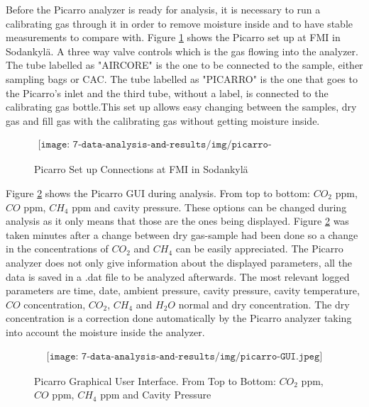 Before the Picarro analyzer is ready for analysis, it is necessary to run a calibrating gas through it in order to remove moisture inside and to have stable measurements to compare with. Figure \ref{fig:picarro-connections} shows the Picarro set up at FMI in Sodankyl\"{a}. A three way valve controls which is the gas flowing into the analyzer. The tube labelled as "AIRCORE" is the one to be connected to the sample, either sampling bags or CAC. The tube labelled as "PICARRO" is the one that goes to the Picarro's inlet and the third tube, without a label, is connected to the calibrating gas bottle.This set up allows easy changing between the samples, dry gas and fill gas with the calibrating gas without getting moisture inside.

\begin{figure}[H]
    \begin{align*}
        \texttt{[image: 7-data-analysis-and-results/img/picarro-connections.jpeg]}
    \end{align*}
    \caption{Picarro Set up Connections at FMI in Sodankyl\"{a} \label{fig:picarro-connections}}
\end{figure}

Figure \ref{fig:picarro-GUI} shows the Picarro GUI during analysis. From top to bottom: $CO_2$ ppm, $CO$ ppm, $CH_4$ ppm and cavity pressure. These options can be changed during analysis as it only means that those are the ones being displayed. Figure \ref{fig:picarro-GUI} was taken minutes after a change between dry gas-sample had been done so a change in the concentrations of $CO_2$ and $CH_4$ can be easily appreciated. 
The Picarro analyzer does not only give information about the displayed parameters, all the data is saved in a .dat file to be analyzed afterwards. The most relevant logged parameters are time, date, ambient pressure, cavity pressure, cavity temperature, $CO$ concentration, $CO_2$, $CH_4$ and $H_2O$ normal and dry concentration. The dry concentration is a correction done automatically by the Picarro analyzer taking into account the moisture inside the analyzer. 

\begin{figure}[H]
    \begin{align*}
        \texttt{[image: 7-data-analysis-and-results/img/picarro-GUI.jpeg]}
    \end{align*}
    \caption{Picarro Graphical User Interface. From Top to Bottom: $CO_2$ ppm, $CO$ ppm, $CH_4$ ppm and Cavity Pressure  \label{fig:picarro-GUI}}
\end{figure}


